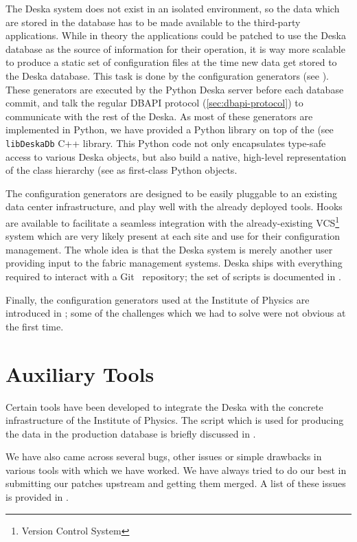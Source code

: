 \documentclass[deska]{subfiles}
\begin{document}
The Deska system does not exist in an isolated environment, so the data which are stored in the database has to be made
available to the third-party applications.  While in theory the applications could be patched to use the Deska database
as the source of information for their operation, it is way more scalable to produce a static set of configuration files
at the time new data get stored to the Deska database.  This task is done by the configuration generators (see
).  These generators are executed by the Python Deska server before each database commit,
and talk the regular DBAPI protocol (\ref{sec:dbapi-protocol}) to communicate with the rest of the Deska.  As most of
these generators are implemented in Python, we have provided a Python library on top of the (see
 {\tt libDeskaDb} C++ library.  This Python code not only encapsulates type-safe access to
various Deska objects, but also build a native, high-level representation of the class hierarchy (see
 as first-class Python objects.

The configuration generators are designed to be easily pluggable to an existing data center infrastructure, and play
well with the already deployed tools.  Hooks are available to facilitate a seamless integration with the
already-existing VCS\footnote{Version Control System} system which are very likely present at each site and use for
their configuration management.  The whole idea is that the Deska system is merely another user providing input to the
fabric management systems.  Deska ships with everything required to interact with a Git~\cite{git} repository; the set
of scripts is documented in .

Finally, the configuration generators used at the Institute of Physics are introduced in ; some
of the challenges which we had to solve were not obvious at the first time.

\section{Auxiliary Tools}

Certain tools have been developed to integrate the Deska with the concrete infrastructure of the Institute of Physics.
The script which is used for producing the data in the production database is briefly discussed in
.

We have also came across several bugs, other issues or simple drawbacks in various tools with which we have worked.  We
have always tried to do our best in submitting our patches upstream and getting them merged.  A list of these issues is
provided in .
\end{document}
